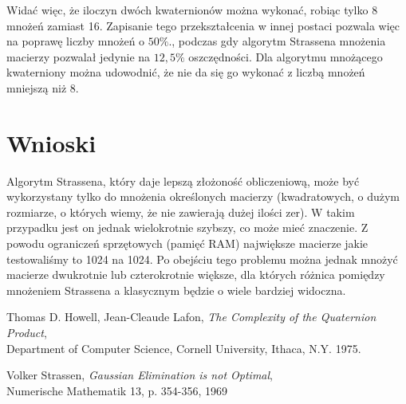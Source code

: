 \documentclass[paper=a4, fontsize=11pt]{scrartcl} %
\numberwithin{equation}{section} %
\numberwithin{figure}{section} %
\numberwithin{table}{section} %
\begin{document}
Widać więc, że iloczyn dwóch kwaternionów można wykonać, robiąc tylko 8 mnożeń zamiast 16\cite{quaternion}. 
Zapisanie tego przekształcenia w innej postaci pozwala więc na poprawę liczby mnożeń o ${50\%}$., 
podczas gdy algorytm Strassena mnożenia macierzy pozwalał jedynie na ${12,5\%}$ oszczędności.\medbreak
Dla algorytmu mnożącego kwaterniony można udowodnić, że nie da się go wykonać z liczbą mnożeń mniejszą niż 8.\cite{quaternion}

\section{Wnioski}
Algorytm Strassena, który daje lepszą złożoność obliczeniową, może być wykorzystany
tylko do mnożenia określonych macierzy 
(kwadratowych, o dużym rozmiarze, o których wiemy, że nie zawierają dużej ilości zer).
W takim przypadku jest on jednak wielokrotnie szybszy, co może mieć znaczenie.
Z powodu ograniczeń sprzętowych (pamięć RAM) największe macierze jakie testowaliśmy
to 1024 na 1024.
Po obejściu tego problemu można jednak mnożyć macierze dwukrotnie lub czterokrotnie większe, 
dla których różnica pomiędzy mnożeniem Strassena a klasycznym będzie o wiele bardziej widoczna.

\begin{thebibliography}{9}

  Thomas D. Howell,
  Jean-Cleaude Lafon,
  \textit{The Complexity of the Quaternion Product}, \\
  Department of Computer Science, Cornell University, Ithaca, N.Y.
  1975.

  Volker Strassen,
  \textit{Gaussian Elimination is not Optimal}, \\
  Numerische Mathematik 13, p. 354-356, 1969
\end{thebibliography}
\end{document}
